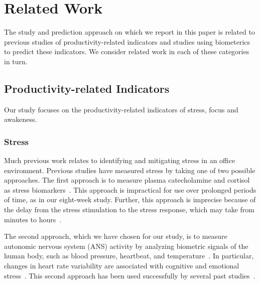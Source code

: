 \section{Related Work}

The study and prediction approach on which we report in this paper is related
to previous studies of productivity-related indicators and studies
using biometerics to predict these indicators. We consider
related work in each of these categories in turn.

\subsection{Productivity-related Indicators}

Our study focuses on the productivity-related indicators of stress, focus and awakeness.



\subsubsection{Stress}
Much previous work relates to identifying and mitigating stress in an office environment.
Previous studies have measured stress by taking one of two possible approaches.
The first approach is to measure plasma catecholamine and cortisol as stress biomarkers~\cite{piazza10}.
This approach is impractical for use over prolonged periods of time, as in our eight-week study.
Further, this approach is imprecise because of the delay from the stress stimulation to the stress response, which 
may take from minutes to hours~\cite{Chandola10,Hellhammer09}.

The second approach, which we have chosen for our study, is to measure autonomic nervous system (ANS) activity by analyzing biometric signals of the human body, such as blood pressure, heartbeat, and temperature~\cite{kataoka00,Eekelen04,valentini10}.
In particular, changes in heart rate variability are associated with cognitive and emotional stress~\cite{mcduff16,dishman2000stress}.
This second approach has been used successfully by several past studies~\cite{Force96,gal07,montano09}.

